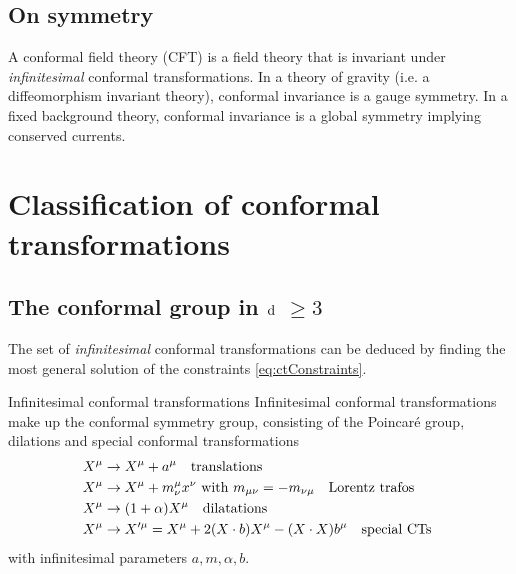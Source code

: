 \subsection{On symmetry}
A conformal field theory (CFT) is a field theory that is invariant under \emph{infinitesimal} conformal transformations. In a theory of gravity (i.e. a diffeomorphism invariant theory), conformal invariance is a gauge symmetry. In a fixed background theory, conformal invariance is a global symmetry implying conserved currents.







\section{Classification of conformal transformations}
\subsection[The conformal group in greater or equal to three dimensions]{The conformal group in $\mathrm{d}$ $\geq 3$}
The set of \emph{infinitesimal} conformal transformations can be deduced by finding the most general solution of the constraints \ref{eq:ctConstraints}.
\begin{mybox}{Infinitesimal conformal transformations}
Infinitesimal conformal transformations make up the conformal symmetry group, consisting of the Poincaré group, dilations and special conformal transformations
\begin{align}
	&X^\mu \rightarrow X^\mu + a^\mu \quad \text{translations} \\
	&X^\mu \rightarrow X^\mu + m^\mu_\nu x^\nu \text{ with }m_{\mu \nu}=-m_{\nu \mu} \quad \text{Lorentz trafos}\\
	&X^\mu \rightarrow (1+\alpha) X^\mu \quad \text{dilatations} \\
	&X^\mu \rightarrow X^{\prime \mu}= X^\mu + 2 (X\cdot b) X^\mu - (X\cdot X) b^\mu \quad \text{special CTs } 
\end{align}
with infinitesimal parameters $a,m, \alpha,b$.
\end{mybox}
